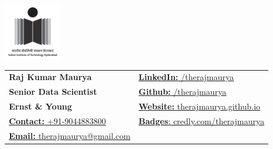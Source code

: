 \documentclass[a4paper,10pt]{article}
\begin{document}
\begin{table}
    \begin{minipage}{0.15\linewidth}
        \centering
        \includegraphics[width=25mm]{iith_logo_black.jpg}
    \end{minipage}
    \begin{minipage}{0.65\linewidth}
        \setlength{\tabcolsep}{30pt}
        \def\arraystretch{1.15}
        \begin{tabular}{ll}
            \textbf{Raj Kumar Maurya}  &  \href{https://www.linkedin.com/in/therajmaurya}{\textbf{LinkedIn:} /therajmaurya}\\
            \textbf{Senior Data Scientist} & 
            \href{https://github.com/therajmaurya}{\textbf{Github:} /therajmaurya}\\
            \textbf{Ernst \& Young} & 
            \href{https://therajmaurya.github.io}{\textbf{Website:} therajmaurya.github.io}\\
            \href{tel:+919044883800}{\textbf{Contact:} +91-9044883800} & \href{https://www.credly.com/users/therajmaurya/badges}{\textbf{Badges}: credly.com/therajmaurya}\\
            \href{mailto:therajmaurya@gmail.com}{\textbf{Email:} therajmaurya@gmail.com} & 
            {\textbf{}}
        \end{tabular}
    \end{minipage}\hfill
\end{table}    
\end{document}
